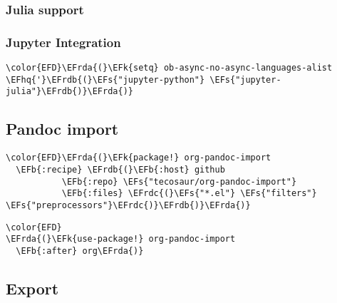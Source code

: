 \documentclass[12pt]{article}
\theoremstyle{plain}%
\theoremstyle{definition}
\theoremstyle{remark}
\newcommand{\EFs}[1]{\textcolor{EFs}{#1}} %
\newcommand{\EFk}[1]{\textcolor{EFk}{#1}} %
\newcommand{\EFb}[1]{\textcolor{EFb}{#1}} %
\newcommand{\EFhq}[1]{\textcolor{EFhq}{#1}} %
\newcommand{\EFrda}[1]{\textcolor{EFrda}{#1}} %
\newcommand{\EFrdb}[1]{\textcolor{EFrdb}{#1}} %
\newcommand{\EFrdc}[1]{\textcolor{EFrdc}{#1}} %
\begin{document}
\subsubsection{Julia support}
\label{sec:orgfd8e4f8}
\subsubsection{Jupyter Integration}
\label{sec:org7c40346}
\begin{Code}
\begin{Verbatim}
\color{EFD}\EFrda{(}\EFk{setq} ob-async-no-async-languages-alist \EFhq{'}\EFrdb{(}\EFs{"jupyter-python"} \EFs{"jupyter-julia"}\EFrdb{)}\EFrda{)}
\end{Verbatim}
\end{Code}
\subsection{Pandoc import}
\label{sec:orgb9e6823}
\begin{Code}
\begin{Verbatim}
\color{EFD}\EFrda{(}\EFk{package!} org-pandoc-import
  \EFb{:recipe} \EFrdb{(}\EFb{:host} github
           \EFb{:repo} \EFs{"tecosaur/org-pandoc-import"}
           \EFb{:files} \EFrdc{(}\EFs{"*.el"} \EFs{"filters"} \EFs{"preprocessors"}\EFrdc{)}\EFrdb{)}\EFrda{)}
\end{Verbatim}
\end{Code}
\begin{Code}
\begin{Verbatim}
\color{EFD}
\EFrda{(}\EFk{use-package!} org-pandoc-import
  \EFb{:after} org\EFrda{)}
\end{Verbatim}
\end{Code}
\subsection{Export}
\label{sec:org64d515a}
\end{document}
